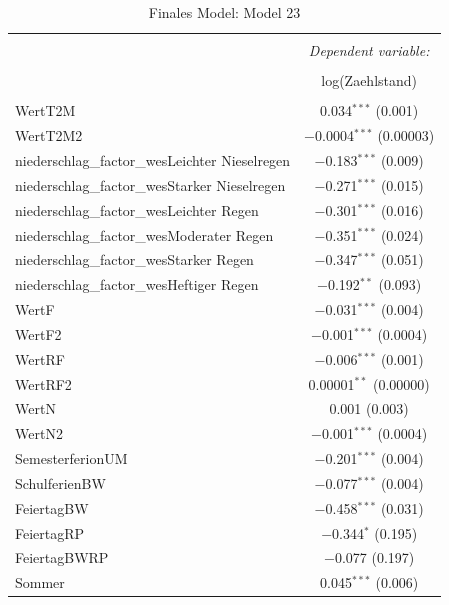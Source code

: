 \documentclass[a4paper,12pt]{thesis}
\begin{document}
\begin{table}[!htbp] \centering 
	\caption{Finales Model: Model 23} 
	\label{FinalFinalModel} 
	\small 
	\begin{tabular}{@{\extracolsep{-15pt}}lc} 
		\\[-1.8ex]\hline 
		\hline \\[-1.8ex] 
		& \multicolumn{1}{c}{\textit{Dependent variable:}} \\ 
		\cline{2-2} 
		\\[-1.8ex] & log(Zaehlstand) \\ 
		\hline \\[-1.8ex] 
		WertT2M & 0.034$^{***}$ (0.001) \\ 
		WertT2M2 & $-$0.0004$^{***}$ (0.00003) \\ 
		niederschlag\_factor\_wesLeichter Nieselregen & $-$0.183$^{***}$ (0.009) \\ 
		niederschlag\_factor\_wesStarker Nieselregen & $-$0.271$^{***}$ (0.015) \\ 
		niederschlag\_factor\_wesLeichter Regen & $-$0.301$^{***}$ (0.016) \\ 
		niederschlag\_factor\_wesModerater Regen & $-$0.351$^{***}$ (0.024) \\ 
		niederschlag\_factor\_wesStarker Regen & $-$0.347$^{***}$ (0.051) \\ 
		niederschlag\_factor\_wesHeftiger Regen & $-$0.192$^{**}$ (0.093) \\ 
		WertF & $-$0.031$^{***}$ (0.004) \\ 
		WertF2 & $-$0.001$^{***}$ (0.0004) \\ 
		WertRF & $-$0.006$^{***}$ (0.001) \\ 
		WertRF2 & 0.00001$^{**}$ (0.00000) \\ 
		WertN & 0.001 (0.003) \\ 
		WertN2 & $-$0.001$^{***}$ (0.0004) \\ 
		SemesterferionUM & $-$0.201$^{***}$ (0.004) \\ 
		SchulferienBW & $-$0.077$^{***}$ (0.004) \\ 
		FeiertagBW & $-$0.458$^{***}$ (0.031) \\ 
		FeiertagRP & $-$0.344$^{*}$ (0.195) \\ 
		FeiertagBWRP & $-$0.077 (0.197) \\ 
		Sommer & 0.045$^{***}$ (0.006) \\ 

\end{tabular}
\end{table}
\end{document}
